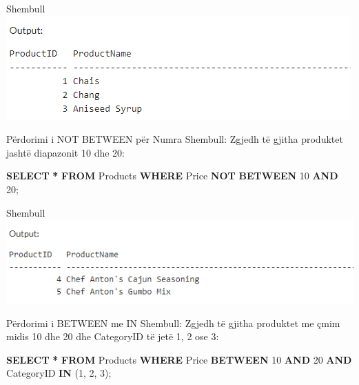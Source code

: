 \documentclass[
  ignorenonframetext,
]{beamer}
\newenvironment{Shaded}{\begin{snugshade}}{\end{snugshade}}
\newcommand{\DecValTok}[1]{\textcolor[rgb]{0.00,0.00,0.81}{#1}}
\newcommand{\KeywordTok}[1]{\textcolor[rgb]{0.13,0.29,0.53}{\textbf{#1}}}
\newcommand{\NormalTok}[1]{#1}
\newcommand{\OperatorTok}[1]{\textcolor[rgb]{0.81,0.36,0.00}{\textbf{#1}}}
\begin{document}
\begin{frame}{Shembull}
\label{shembull-23}
\includegraphics{./Figs/query78.png}
\end{frame}

\begin{frame}[fragile]{Përdorimi i NOT BETWEEN për Numra}
\label{puxebrdorimi-i-not-between-puxebr-numra}
Shembull: Zgjedh të gjitha produktet jashtë diapazonit 10 dhe 20:

\begin{Shaded}
\begin{Highlighting}[]
\KeywordTok{SELECT} \OperatorTok{*}
\KeywordTok{FROM}\NormalTok{ Products}
\KeywordTok{WHERE}\NormalTok{ Price }\KeywordTok{NOT} \KeywordTok{BETWEEN} \DecValTok{10} \KeywordTok{AND} \DecValTok{20}\NormalTok{;}
\end{Highlighting}
\end{Shaded}
\end{frame}

\begin{frame}{Shembull}
\label{shembull-24}
\includegraphics{./Figs/query79.png}
\end{frame}

\begin{frame}[fragile]{Përdorimi i BETWEEN me IN}
\label{puxebrdorimi-i-between-me-in}
Shembull: Zgjedh të gjitha produktet me çmim midis 10 dhe 20 dhe
CategoryID të jetë 1, 2 ose 3:

\begin{Shaded}
\begin{Highlighting}[]
\KeywordTok{SELECT} \OperatorTok{*}
\KeywordTok{FROM}\NormalTok{ Products}
\KeywordTok{WHERE}\NormalTok{ Price }\KeywordTok{BETWEEN} \DecValTok{10} \KeywordTok{AND} \DecValTok{20}
\KeywordTok{AND}\NormalTok{ CategoryID }\KeywordTok{IN}\NormalTok{ (}\DecValTok{1}\NormalTok{, }\DecValTok{2}\NormalTok{, }\DecValTok{3}\NormalTok{);}
\end{Highlighting}
\end{Shaded}
\end{frame}
\end{document}
